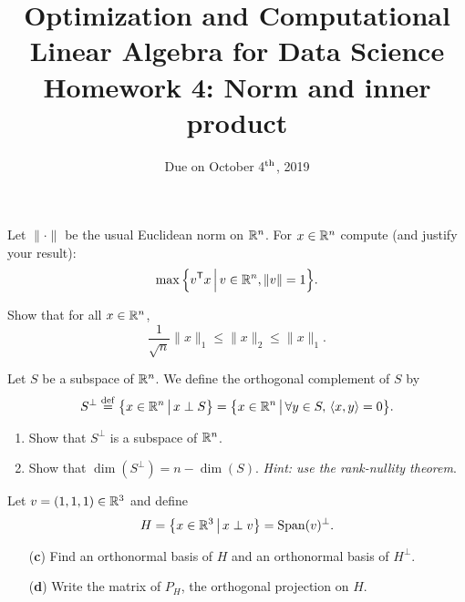 \documentclass[11pt,nocut]{article}
\title{\vspace{-3.0cm}%
	Optimization and Computational Linear Algebra for Data Science\\
Homework 4: Norm and inner product}
\date{\vspace{-1cm}Due on October 4$^{\rm th}$, 2019}
\begin{document}
\maketitle




\begin{problem}[2 points]
	Let $\| \cdot \|$ be the usual Euclidean norm on $\mathbb{R}^n$.
	For $x \in \mathbb{R}^n$ compute (and justify your result):
	$$
	\max \Big\{ v^{{\sf T}} x \, \Big| \, v \in \mathbb{R}^n, \|v\|=1 \Big\}.
$$
\end{problem}

\vspace{1mm} 

\begin{problem}[2 points]
	Show that for all $x \in \mathbb{R}^n$,
	$$
	\frac{1}{\sqrt{n}} \|x\|_1 \leq \|x\|_2 \leq \|x\|_1.
	$$
\end{problem}

\vspace{1mm}



\begin{problem}[4 points]
	Let $S$ be a subspace of $\mathbb{R}^n$. We define the orthogonal complement of $S$ by
	$$
	S^{\perp} \overset{\rm def}{=} 
	\big\{ x \in \mathbb{R}^n \, \big| \, x \perp S \big\} = 
	\big\{ x \in \mathbb{R}^n \, \big| \, \forall y \in S, \, \langle x,y \rangle = 0 \big\}.
	$$
	\begin{enumerate}[label=\normalfont(\textbf{\alph*})]
		\item Show that $S^{\perp}$ is a subspace of $\mathbb{R}^n$.
		\item Show that $\dim(S^{\perp}) = n - \dim(S)$. \textit{Hint: use the rank-nullity theorem}.
	\end{enumerate}
	Let $v = (1,1,1) \in \mathbb{R}^3$ and define
	$$
	H = 
	\big\{ x \in \mathbb{R}^3 \, \big| \, x \perp v \big\} = {{\rm Span}}(v)^{\perp}.
	$$
	\begin{enumerate}[label=\normalfont(\textbf{\alph*})]
		\item[\normalfont(\textbf{c})] Find an orthonormal basis of $H$ and an orthonormal basis of $H^{\perp}$.
		\item[\normalfont(\textbf{d})] Write the matrix of $P_H$, the orthogonal projection on $H$.
	\end{enumerate}
\end{problem}

\vspace{1mm}
\end{document}
